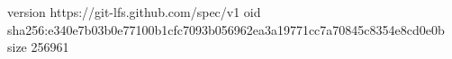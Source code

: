 version https://git-lfs.github.com/spec/v1
oid sha256:e340e7b03b0e77100b1cfc7093b056962ea3a19771cc7a70845c8354e8cd0e0b
size 256961
